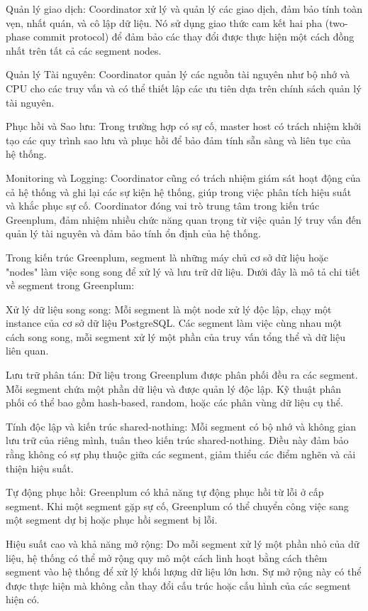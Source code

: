 \documentclass{article}[14pt]
\begin{document}
{Quản lý giao dịch: Coordinator xử lý và quản lý các giao dịch, đảm bảo tính toàn vẹn, nhất quán, và cô lập dữ liệu. Nó sử dụng giao thức cam kết hai pha (two-phase commit protocol) để đảm bảo các thay đổi được thực hiện một cách đồng nhất trên tất cả các segment nodes.

Quản lý Tài nguyên: Coordinator quản lý các nguồn tài nguyên như bộ nhớ và CPU cho các truy vấn và có thể thiết lập các ưu tiên dựa trên chính sách quản lý tài nguyên.

Phục hồi và Sao lưu: Trong trường hợp có sự cố, master host có trách nhiệm khởi tạo các quy trình sao lưu và phục hồi để bảo đảm tính sẵn sàng và liên tục của hệ thống.

Monitoring và Logging: Coordinator cũng có trách nhiệm giám sát hoạt động của cả hệ thống và ghi lại các sự kiện hệ thống, giúp trong việc phân tích hiệu suất và khắc phục sự cố. Coordinator đóng vai trò trung tâm trong kiến trúc Greenplum, đảm nhiệm nhiều chức năng quan trọng từ việc quản lý truy vấn đến quản lý tài nguyên và đảm bảo tính ổn định của hệ thống.

Trong kiến trúc Greenplum, segment là những máy chủ cơ sở dữ liệu hoặc
"nodes" làm việc song song để xử lý và lưu trữ dữ liệu. Dưới đây là mô tả chi tiết về segment trong Greenplum:

Xử lý dữ liệu song song: Mỗi segment là một node xử lý độc lập, chạy một instance của cơ sở dữ liệu PostgreSQL. Các segment làm việc cùng nhau một cách song song, mỗi segment xử lý một phần của truy vấn tổng thể và dữ liệu liên quan.

Lưu trữ phân tán: Dữ liệu trong Greenplum được phân phối đều ra các segment. Mỗi segment chứa một phần dữ liệu và được quản lý độc lập.
Kỹ thuật phân phối có thể bao gồm hash-based, random, hoặc các phân vùng
dữ liệu cụ thể. 

Tính độc lập và kiến trúc shared-nothing:
Mỗi segment có bộ nhớ và không gian lưu trữ của riêng mình, tuân theo kiến trúc shared-nothing. Điều này đảm bảo rằng không có sự phụ thuộc giữa các segment, giảm thiểu các điểm nghẽn và cải thiện hiệu suất.

Tự động phục hồi: Greenplum có khả năng tự động phục hồi từ lỗi ở cấp segment. Khi một segment gặp sự cố, Greenplum có thể chuyển công việc sang một segment dự bị hoặc phục hồi segment bị lỗi.

Hiệu suất cao và khả năng mở rộng: Do mỗi segment xử lý một phần nhỏ của dữ liệu, hệ thống có thể mở rộng quy mô một cách linh hoạt bằng cách thêm segment vào hệ thống để xử lý khối lượng dữ liệu lớn hơn.
Sự mở rộng này có thể được thực hiện mà không cần thay đổi cấu trúc hoặc
cấu hình của các segment hiện có.

}
\end{document}
